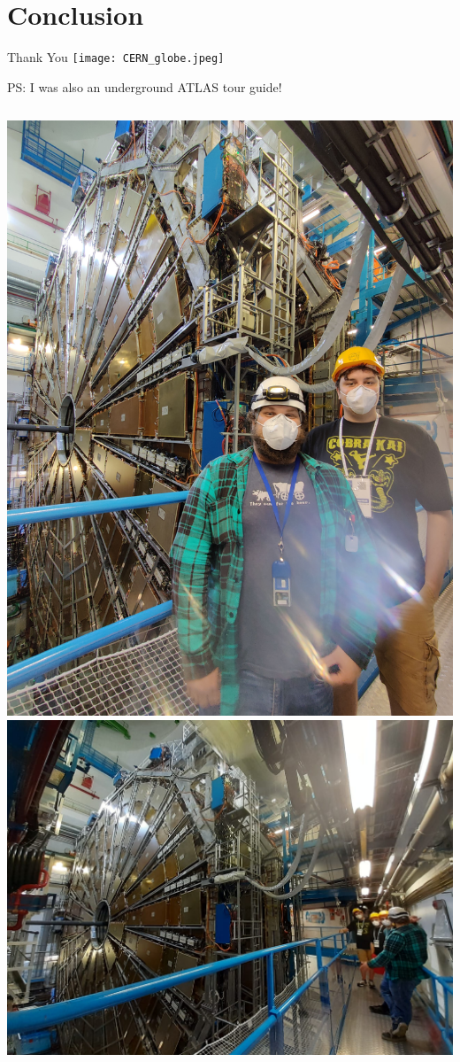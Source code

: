 \documentclass[aspectratio=169,xcolor=table]{beamer}
\begin{document}
\section{Conclusion}

  \begin{frame}{Thank You}
    \centering
    \texttt{[image: CERN\_globe.jpeg]}
  \end{frame}

  \begin{frame}{PS: I was also an underground ATLAS tour guide!}
    \begin{columns}
    \includegraphics[width=\textwidth,keepaspectratio=true,angle=270,origin=c]{WillAndMeAtATLAS.jpg}
    \includegraphics[width=\textwidth,keepaspectratio=true]{ATLAS_Tour.jpg}

\end{columns}
\end{frame}
\end{document}
